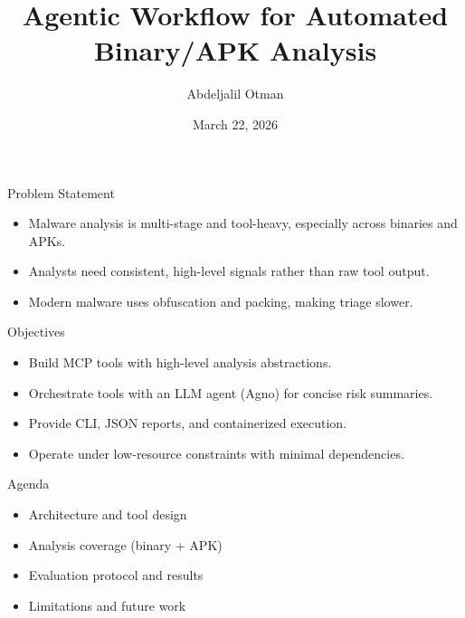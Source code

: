 \documentclass{beamer}
\title{Agentic Workflow for Automated Binary/APK Analysis}
\author{Abdeljalil Otman}
\date{March 22, 2026}
\begin{document}
\begin{frame}
  \titlepage
\end{frame}

\begin{frame}{Problem Statement}
  \begin{itemize}
    \item Malware analysis is multi-stage and tool-heavy, especially across binaries and APKs.
    \item Analysts need consistent, high-level signals rather than raw tool output.
    \item Modern malware uses obfuscation and packing, making triage slower.
  \end{itemize}
\end{frame}

\begin{frame}{Objectives}
  \begin{itemize}
    \item Build MCP tools with high-level analysis abstractions.
    \item Orchestrate tools with an LLM agent (Agno) for concise risk summaries.
    \item Provide CLI, JSON reports, and containerized execution.
    \item Operate under low-resource constraints with minimal dependencies.
  \end{itemize}
\end{frame}

\begin{frame}{Agenda}
  \begin{itemize}
    \item Architecture and tool design
    \item Analysis coverage (binary + APK)
    \item Evaluation protocol and results
    \item Limitations and future work
  \end{itemize}
\end{frame}
\end{document}
